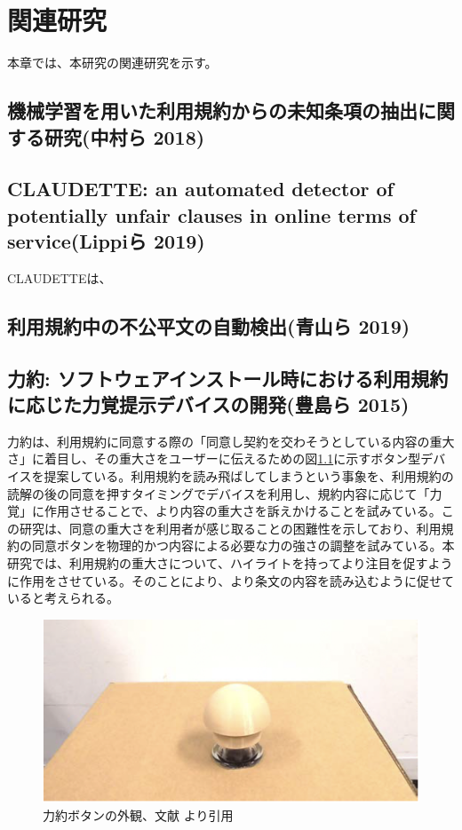 \chapter{関連研究}
\label{related}

本章では、本研究の関連研究を示す。

\section{機械学習を用いた利用規約からの未知条項の抽出に関する研究(中村ら 2018)}

\section{CLAUDETTE: an automated detector of potentially unfair clauses in online terms of service(Lippiら 2019)}
CLAUDETTEは、

\section{利用規約中の不公平文の自動検出(青山ら 2019)}

\section{力約: ソフトウェアインストール時における利用規約に応じた力覚提示デバイスの開発(豊島ら 2015)\cite{weko_145305_1}}
力約\cite{weko_145305_1}は、利用規約に同意する際の「同意し契約を交わそうとしている内容の重大さ」に着目し、その重大さをユーザーに伝えるための図\ref{img:rikiyaku}に示すボタン型デバイスを提案している。利用規約を読み飛ばしてしまうという事象を、利用規約の読解の後の同意を押すタイミングでデバイスを利用し、規約内容に応じて「力覚」に作用させることで、より内容の重大さを訴えかけることを試みている。この研究は、同意の重大さを利用者が感じ取ることの困難性を示しており、利用規約の同意ボタンを物理的かつ内容による必要な力の強さの調整を試みている。本研究では、利用規約の重大さについて、ハイライトを持ってより注目を促すように作用をさせている。そのことにより、より条文の内容を読み込むように促せていると考えられる。
\begin{figure}[h]
  \begin{center}
      \includegraphics[width=13cm]{img/rikiyaku.png}
      \caption{力約ボタンの外観、文献\cite{weko_145305_1} より引用}
      \label{img:rikiyaku}
  \end{center}
\end{figure}

